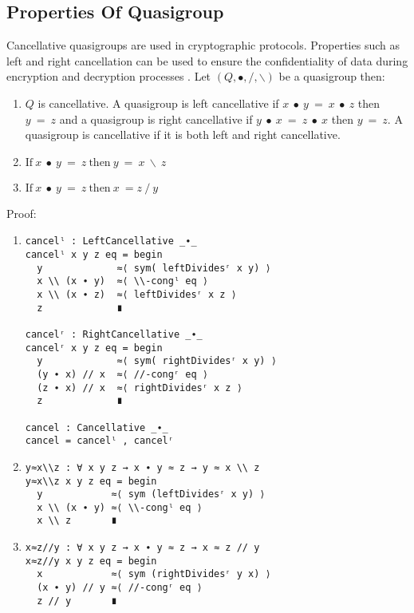 \subsection{Properties Of Quasigroup}
Cancellative quasigroups are used in cryptographic protocols. Properties such as
left and right cancellation can be used to ensure the confidentiality of data
during encryption and decryption processes \cite{shcherbacov2003elements}. Let
$(Q, ∙, /, \backslash)$ be a quasigroup then:
\begin{enumerate}
\item $Q$ is cancellative. A quasigroup is left cancellative if $x\ ∙\ y\ =\ x\ ∙\ z$ then
$y\ =\ z$ and a quasigroup is right cancellative if $y\ ∙\ x\ =\ z\ ∙\ x$ then $y\ =\ z$. A
quasigroup is cancellative if it is both left and right cancellative.
\item \(\text{If} \ x\ ∙\ y\ =\ z\ \text{then}\ y\ =\ x\ \backslash \ z\)
\item \(\text{If} \ x\ ∙\ y\ =\ z\ \text{then}\ x\ = z\ /\ y\)
\end{enumerate}
Proof:
\begin{enumerate}
\item 
\begin{verbatim}
cancelˡ : LeftCancellative _∙_
cancelˡ x y z eq = begin
  y             ≈⟨ sym( leftDividesʳ x y) ⟩
  x \\ (x ∙ y)  ≈⟨ \\-congˡ eq ⟩
  x \\ (x ∙ z)  ≈⟨ leftDividesʳ x z ⟩
  z             ∎

cancelʳ : RightCancellative _∙_
cancelʳ x y z eq = begin
  y             ≈⟨ sym( rightDividesʳ x y) ⟩
  (y ∙ x) // x  ≈⟨ //-congʳ eq ⟩
  (z ∙ x) // x  ≈⟨ rightDividesʳ x z ⟩
  z             ∎

cancel : Cancellative _∙_
cancel = cancelˡ , cancelʳ
\end{verbatim}

\item 
\begin{verbatim}
y≈x\\z : ∀ x y z → x ∙ y ≈ z → y ≈ x \\ z
y≈x\\z x y z eq = begin
  y            ≈⟨ sym (leftDividesʳ x y) ⟩
  x \\ (x ∙ y) ≈⟨ \\-congˡ eq ⟩
  x \\ z       ∎
\end{verbatim}

\item 
\begin{verbatim}
x≈z//y : ∀ x y z → x ∙ y ≈ z → x ≈ z // y
x≈z//y x y z eq = begin
  x            ≈⟨ sym (rightDividesʳ y x) ⟩
  (x ∙ y) // y ≈⟨ //-congʳ eq ⟩
  z // y       ∎
\end{verbatim}
\end{enumerate}

